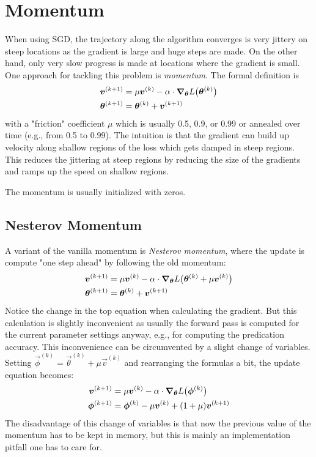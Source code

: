 	\section{Momentum}
		When using SGD, the trajectory along the algorithm converges is very jittery on steep locations as the gradient is large and huge steps are made. On the other hand, only very slow progress is made at locations where the gradient is small. One approach for tackling this problem is \emph{momentum}. The formal definition is
		\begin{align}
			\bm{v}^{(k + 1)}      & = \mu \bm{v}^{(k)} - \alpha \cdot \grad_{\bm{\theta}} L\bigl(\bm{\theta}^{(k)}\bigr) \\
			\bm{\theta}^{(k + 1)} & = \bm{\theta}^{(k)} + \bm{v}^{(k + 1)}
		\end{align}
		with a "friction" coefficient \(\mu\) which is usually \num{0.5}, \num{0.9}, or \num{0.99} or annealed over time (e.g., from \num{0.5} to \num{0.99}). The intuition is that the gradient can build up velocity along shallow regions of the loss which gets damped in steep regions. This reduces the jittering at steep regions by reducing the size of the gradients and ramps up the speed on shallow regions.

		The momentum is usually initialized with zeros.

		\subsection{Nesterov Momentum}
			A variant of the vanilla momentum is \emph{Nesterov momentum}, where the update is compute "one step ahead" by following the old momentum:
			\begin{align}
				\bm{v}^{(k + 1)}      & = \mu \bm{v}^{(k)} - \alpha \cdot \grad_{\bm{\theta}} L\bigl( \bm{\theta}^{(k)} + \mu \bm{v}^{(k)} \bigr) \\
				\bm{\theta}^{(k + 1)} & = \bm{\theta}^{(k)} + \bm{v}^{(k + 1)}
			\end{align}
			Notice the change in the top equation when calculating the gradient. But this calculation is slightly inconvenient as usually the forward pass is computed for the current parameter settings anyway, e.g., for computing the predication accuracy. This inconvenience can be circumvented by a slight change of variables. Setting \( \vec{\phi}^{(k)} = \vec{\theta}^{(k)} + \mu \vec{v}^{(k)} \) and rearranging the formulas a bit, the update equation becomes:
			\begin{align}
				\bm{v}^{(k + 1)}    & = \mu \bm{v}^{(k)} - \alpha \cdot \grad_{\bm{\theta}} L\bigl(\bm{\phi}^{(k)}\bigr) \\
				\bm{\phi}^{(k + 1)} & = \bm{\phi}^{(k)} - \mu \bm{v}^{(k)} + (1 + \mu) \bm{v}^{(k + 1)}
			\end{align}
			The disadvantage of this change of variables is that now the previous value of the momentum has to be kept in memory, but this is mainly an implementation pitfall one has to care for.

